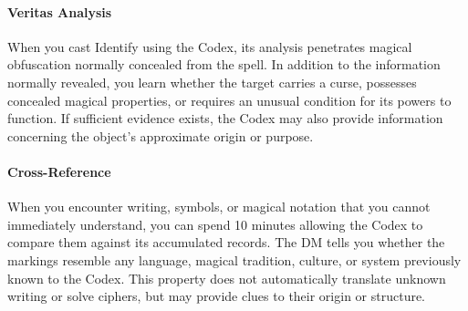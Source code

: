 \documentclass[letterpaper,openany,oneside,twocolumn]{book}
\begin{document}
\paragraph*{Veritas Analysis} When you cast Identify using the Codex, its analysis penetrates magical obfuscation normally concealed from the spell. In addition to the information normally revealed, you learn whether the target carries a curse, possesses concealed magical properties, or requires an unusual condition for its powers to function. If sufficient evidence exists, the Codex may also provide information concerning the object's approximate origin or purpose.\\
\paragraph*{Cross-Reference} When you encounter writing, symbols, or magical notation that you cannot immediately understand, you can spend 10 minutes allowing the Codex to compare them against its accumulated records. The DM tells you whether the markings resemble any language, magical tradition, culture, or system previously known to the Codex. This property does not automatically translate unknown writing or solve ciphers, but may provide clues to their origin or structure.
\end{document}
